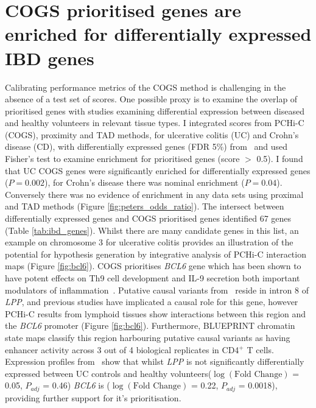 \documentclass[a4paper,11pt]{report}
\begin{document}
\section{COGS prioritised genes are enriched for differentially expressed IBD genes} 
Calibrating performance metrics of the COGS method is challenging in the absence of a test set of scores. One possible proxy is to examine the overlap of prioritised genes with studies examining differential expression between diseased and healthy volunteers in relevant tissue types. I integrated scores from PCHi-C (COGS), proximity and TAD methods, for ulcerative colitis (UC) and Crohn's disease (CD), with differentially expressed genes (FDR 5\%) from~\citet{PetersLyonsLeeEtAl2016} and used Fisher's test to examine enrichment for prioritised genes (score $>$ 0.5). I found that UC COGS genes were significantly enriched for differentially expressed genes ($P = 0.002$), for Crohn's disease there was nominal enrichment ($P = 0.04$). Conversely there was no evidence of enrichment in any data sets using proximal and TAD methods (Figure \ref{fig:peters_odds_ratio}). The intersect between differentially expressed genes and COGS prioritised genes identified 67 genes (Table \ref{tab:ibd_genes}). Whilst there are many candidate genes in this list, an example on chromosome 3 for ulcerative colitis provides an illustration of the potential for hypothesis generation by integrative analysis of PCHi-C interaction maps (Figure \ref{fig:bcl6}). COGS prioritises \textit{BCL6} gene which has been shown to have potent effects on Th9 cell development and IL-9 secretion both important modulators of inflammation~\citep{BassilOrentOlahEtAl2014}. Putative causal variants from~\citet{Anderson2011-ch} reside in intron 8 of \textit{LPP}, and previous studies have implicated a causal role for this gene, however PCHi-C results from lymphoid tissues show interactions between this region and the \textit{BCL6} promoter (Figure \ref{fig:bcl6}). Furthermore, BLUEPRINT chromatin state maps classify this region harbouring putative causal variants as having enhancer activity across 3 out of 4 biological replicates in CD4$^+$ T cells. Expression profiles from~\citet{PetersLyonsLeeEtAl2016} show that whilst \textit{LPP} is not significantly differentially expressed between UC controls and healthy volunteers($\log(\text{Fold Change})$ = 0.05, $P_{adj}$ =  0.46) \textit{BCL6} is ($\log(\text{Fold Change})$ = 0.22, $P_{adj}$ =  0.0018), providing further support for it's prioritisation.
\end{document}
